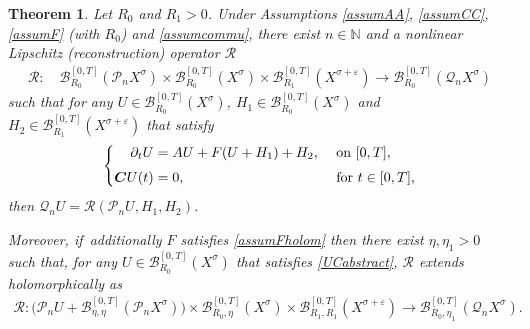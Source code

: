 \documentclass[10pt]{amsart}
\newtheorem{theorem}{Theorem}[section]
\theoremstyle{definition}
\let\mc\mathcal
\let\veps\varepsilon
\newcommand{\B}{\mc{B}}
\newcommand{\N}{\mathbb{N}}
\newcommand{\Q}{\mathcal{Q}}
\renewcommand{\P}{\mathcal{P}}
\newcommand{\bC}{\boldsymbol{C}}
\begin{document}
\begin{theorem}
\label{thmabstract}Let $R_{0}$ and $R_{1}>0$. Under Assumptions \ref{assumAA}, \ref{assumCC}, \ref{assumF} (with $R_{0}$) and \ref{assumcommu}, there exist $n\in \N$ and a nonlinear Lipschitz (reconstruction) operator $\mathcal{R}$
\begin{align}
\label{Rspace}
\mathcal{R}: \quad \B_{R_{0}}^{[0,T]}(\P_n X^{\sigma}) \times \B_{R_{0}}^{[0,T]}(X^{\sigma}) \times \B_{R_{1}}^{[0,T]}(X^{\sigma+\veps}) \to \B_{R_{0}}^{[0,T]}(\Q_n X^{\sigma})
\end{align}
such that for any $U\in \B_{R_{0}}^{[0,T]}(X^{\sigma})$, $H_{1}\in \B_{R_{0}}^{[0,T]}(X^{\sigma})$ and $H_{2}\in \B_{R_{1}}^{[0,T]}(X^{\sigma+\veps})$ that satisfy
\begin{align}\label{UCabstract}
\left\{\begin{aligned}
\partial_t U&=AU+F(U+H_{1})+H_{2}, &&\textnormal{ on } [0,T], \\[3pt]
\bC U(t)&=0, &&\textnormal{ for }t\in [0,T],
\end{aligned}\right.
\end{align}
then $\Q_n U=\mathcal{R}(\P_{n}U,H_{1},H_{2})$.

Moreover, if~additionally $F$ satisfies \cref{assumFholom} then there exist $\eta,\eta_1>0$ such that, for any $U\in \B_{R_{0}}^{[0,T]}(X^{\sigma})$ that satisfies \eqref{UCabstract}, $\mathcal{R}$ extends holomorphically as
\begin{align*}
\mathcal{R}: \bigl( \P_nU+ \B_{\eta,\eta}^{[0,T]}(\P_n X^{\sigma})\bigr) \times \B_{R_{0},\eta}^{[0,T]}(X^{\sigma}) \times \B_{R_{1},R_{1}}^{[0,T]}(X^{\sigma+\veps}) \to \B_{R_{0},\eta_1}^{[0,T]}(\Q_n X^{\sigma}).
\end{align*}
\end{theorem}
\end{document}
